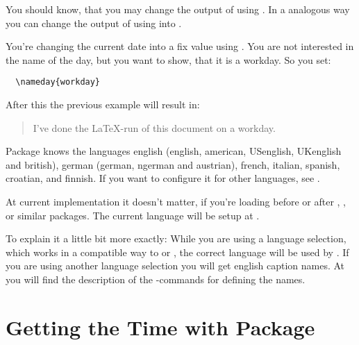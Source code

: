 \begin{Declaration}
\end{Declaration}%
%
You should know, that you may change the output of  using
. In a analogous way you can change the
output of  using  into .
\begin{Example}
  You're changing the current date into a fix value using
  . You are not interested in the name of the day, but
  you want to show, that it is a workday. So you set:
\begin{lstlisting}
  \nameday{workday}
\end{lstlisting}
  After this the previous example will result in:
  \begin{quote}
    I've done the \LaTeX-run of this document on a workday.
  \end{quote}
\end{Example}

Package  knows the languages english (english, american,
USenglish, UKenglish and british), german (german, ngerman and austrian),
french, italian, spanish, croatian, and finnish. If you want to configure it
for other languages, see .

At current implementation it doesn't matter, if you're loading
 before or after
,
,
 or similar packages. The current
language will be setup at .

\begin{Explain}
  To explain it a little bit more exactly: While you are using a
  language selection, which works in a compatible way to
   or
  , the correct language will be
  used by . If you are using another language
  selection you will get english caption names. At 
  you will find the description of the -commands for
  defining the names.
\end{Explain}


\section{Getting the Time with Package }
\label{sec:datetime.scrtime}

